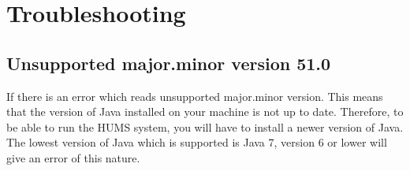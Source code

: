 \documentclass[10pt,a4paper]{article}
\begin{document}
\section{Troubleshooting}

\subsection{Unsupported major.minor version 51.0}

If there is an error which reads unsupported major.minor version. This means that the version of Java installed on your machine is not up to date. Therefore, to be able to run the HUMS system, you will have to install a newer version of Java. The lowest version of Java which is supported is Java 7, version 6 or lower will give an error of this nature.
\end{document}
